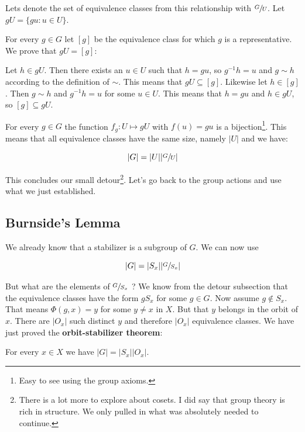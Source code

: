 Lets denote the set of equivalence classes from this relationship with $\sfrac{G}{U}$. Let $gU = \{gu: u \in U\}$.

For every $g \in G$ let $[g]$ be the equivalence class for which $g$ is a representative. We prove that $gU = [g]$: 

Let $h \in gU$. Then there exists an $u \in U$ such that $h = gu$, so $g^{-1}h = u$ and $g \sim h$ according to the definition of $\sim$. This means that $gU \subseteq [g]$.
Likewise let $h \in [g]$. Then $g \sim h$ and $g^{-1} h = u$ for some $u \in U$. This means that $h = gu$ and $h \in gU$, so $[g] \subseteq gU$.

For every $g \in G$ the function $f_g : U \mapsto gU$ with $f(u) = gu$ is a bijection\footnote{Easy to see using the group axioms.}. This means that all equivalence classes have the same size, namely $|U|$ and we have:

$$
|G| = |U| |\sfrac{G}{U}|
$$

This concludes our small detour\footnote{There is a lot more to explore about cosets. I did say that group theory is rich in structure. We only pulled in what was absolutely needed to continue.}. Let's go back to the group actions and use what we just established.

\subsection{Burnside's Lemma}

We already know that a stabilizer is a subgroup of $G$. We can now use

$$
|G| = |S_x| |\sfrac{G}{S_x}|
$$

But what are the elements of $\sfrac{G}{S_x}$ ? We know from the detour subsection that the equivalence classes have the form $gS_x$ for some $g \in G$. Now assume $g \notin S_x$. That means $\Phi(g, x) = y$ for some $y \neq x$ in $X$. But that $y$ belongs in the orbit of $x$. There are $|O_x|$ such distinct $y$ and therefore $|O_x|$ equivalence classes. We have just proved the \textbf{orbit-stabilizer theorem}:

\begin{thm}\label{orbitstabilizer}
For every $x \in X$ we have $|G| = |S_x| |O_x|$.
\end{thm}

